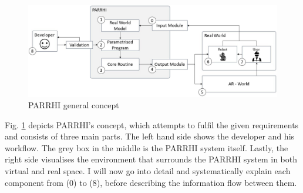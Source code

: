 \begin{figure}[h]
	\centering
	\includegraphics[width=1\textwidth]{Figures/PARRHIConcept03.jpg}
	\caption{PARRHI general concept}
	\label{Fig:PARRHIConcept}
\end{figure}

Fig. \ref{Fig:PARRHIConcept} depicts PARRHI's concept, which attempts to fulfil the given requirements and consists of three main parts. The left hand side shows the developer and his workflow. The grey box in the middle is the PARRHI system itself. Lastly, the right side visualises the environment that surrounds the PARRHI system in both virtual and real space. I will now go into detail and systematically explain each component from (0) to (8), before describing the information flow between them.

